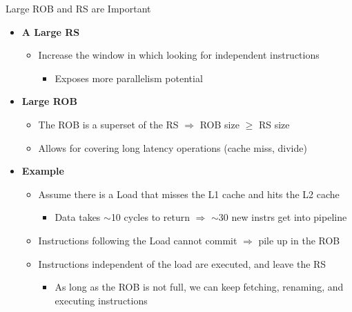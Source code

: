 \documentclass[aspectratio=169,12pt]{beamer}
\begin{document}
\begin{frame}{Large ROB and RS are Important}
  \begin{itemize}
    \item \textbf{A Large RS}
    \begin{itemize}
      \item Increase the window in which looking for independent instructions
      \begin{itemize}
        \item Exposes more parallelism potential
      \end{itemize}
    \end{itemize}
    
    \item \textbf{Large ROB}
    \begin{itemize}
      \item The ROB is a superset of the RS $\Rightarrow$ ROB size $\geq$ RS size
      \item Allows for covering long latency operations (cache miss, divide)
    \end{itemize}
    
    \item \textbf{Example}
    \begin{itemize}
      \item Assume there is a Load that misses the L1 cache and hits the L2 cache
      \begin{itemize}
        \item Data takes $\sim$10 cycles to return $\Rightarrow$ $\sim$30 new instrs get into pipeline
      \end{itemize}
      \item Instructions following the Load cannot commit $\Rightarrow$ pile up in the ROB
      \item Instructions independent of the load are executed, and leave the RS
      \begin{itemize}
        \item As long as the ROB is not full, we can keep fetching, renaming, and executing instructions
      \end{itemize}
    \end{itemize}
  \end{itemize}
\end{frame}
\end{document}
